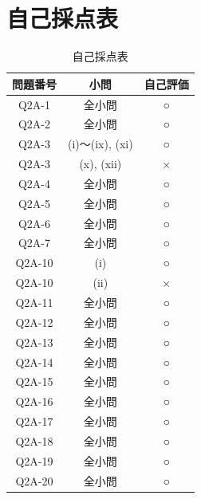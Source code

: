   \clearpage
  \part{自己採点表}
  \begin{table}[H]
    \centering
    \caption{自己採点表}
    \begin{tabular}{c|c|c}
      \hline
      問題番号 & 小問 & 自己評価 \\
      \hline
      Q2A-1 & 全小問 & ○ \\
      Q2A-2 & 全小問 & ○ \\
      Q2A-3 & (i)〜(ix), (xi) & ○ \\
      Q2A-3 & (x), (xii) & × \\
      Q2A-4 & 全小問 & ○ \\
      Q2A-5 & 全小問 & ○ \\
      Q2A-6 & 全小問 & ○ \\
      Q2A-7 & 全小問 & ○ \\
      Q2A-10 & (i) & ○ \\
      Q2A-10 & (ii) & × \\
      Q2A-11 & 全小問 & ○ \\
      Q2A-12 & 全小問 & ○ \\
      Q2A-13 & 全小問 & ○ \\
      Q2A-14 & 全小問 & ○ \\
      Q2A-15 & 全小問 & ○ \\
      Q2A-16 & 全小問 & ○ \\
      Q2A-17 & 全小問 & ○ \\
      Q2A-18 & 全小問 & ○ \\
      Q2A-19 & 全小問 & ○ \\
      Q2A-20 & 全小問 & ○ \\
      \hline
    \end{tabular}
  \end{table}


